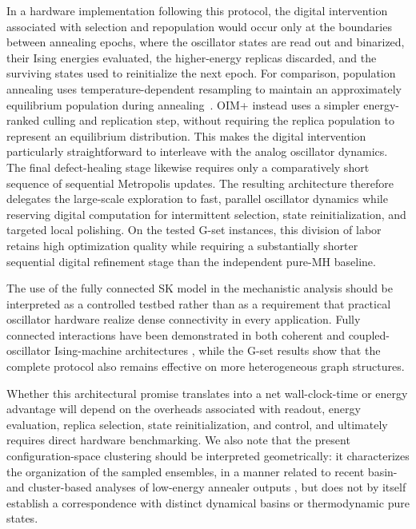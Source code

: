 \documentclass[
reprint,
amsmath,amssymb,
aps,
pre,
floatfix,
]{revtex4-2}
\begin{document}
In a hardware implementation following this protocol, the digital intervention associated with selection and repopulation would occur only at the boundaries between annealing epochs, where the oscillator states are read out and binarized, their Ising energies evaluated, the higher-energy replicas discarded, and the surviving states used to reinitialize the next epoch. For comparison, population annealing uses temperature-dependent resampling to maintain an approximately equilibrium population during annealing~\cite{Wang2015PopulationAnnealing}. OIM+ instead uses a simpler energy-ranked culling and replication step, without requiring the replica population to represent an equilibrium distribution. This makes the digital intervention particularly straightforward to interleave with the analog oscillator dynamics. The final defect-healing stage likewise requires only a comparatively short sequence of sequential Metropolis updates. The resulting architecture therefore delegates the large-scale exploration to fast, parallel oscillator dynamics while reserving digital computation for intermittent selection, state reinitialization, and targeted local polishing. On the tested G-set instances, this division of labor retains high optimization quality while requiring a substantially shorter sequential digital refinement stage than the independent pure-MH baseline.

The use of the fully connected SK model in the mechanistic analysis should
be interpreted as a controlled testbed rather than as a requirement that
practical oscillator hardware realize dense connectivity in every
application. Fully connected interactions have been demonstrated in both
coherent and coupled-oscillator Ising-machine architectures
\cite{machines2,Lo2023}, while the G-set results show that the complete
protocol also remains effective on more heterogeneous graph structures.

Whether this architectural promise translates into a net wall-clock-time or energy advantage will depend on the overheads associated with readout, energy evaluation, replica selection, state reinitialization, and control, and ultimately requires direct hardware benchmarking. We also note that the present configuration-space clustering should be interpreted geometrically: it characterizes the organization of the sampled ensembles, in a manner related to recent basin- and cluster-based analyses of low-energy annealer outputs \cite{Zhang2025Complexity}, but does not by itself establish a correspondence with distinct dynamical basins or thermodynamic pure states.
\end{document}
